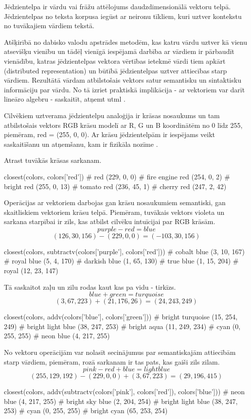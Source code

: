 Jēdzientelpa ir vārdu vai frāžu attēlojums daudzdimensionālā vektoru telpā. Jēdzientelpas no teksta korpusa iegūst ar neironu tīkliem, kuri uztver kontekstu no tuvākajiem vārdiem tekstā. 

Atšķirībā no dabisko valodu apstrādes metodēm, kas katru vārdu uztver kā vienu atsevišķu vienību un tādēļ vienīgā iespējamā darbība ar vārdiem ir pārbaudīt vienādību, katras jēdzientelpas vektora vērtības ietekmē vārdi tiem apkārt (distributed representation) un būtībā jēdzientelpas uztver attiecības starp vārdiem. Rezultātā vārdam atbilstošais vektors satur semantisku un sintaktisku informāciju par vārdu. No tā izriet praktiskā implikācija - ar vektoriem var darīt lineāro algebru - saskaitīt, atņemt utml \cite{colyer2016}.

Cilvēkiem uztverama jēdzientelpu analoģija ir krāsas nosaukums un tam atbilstošais vektors RGB krāsu modelī ar R, G un B koordinātēm no 0 līdz 255, piemēram, red = (255, 0, 0). Ar krāsu jēdzientelpām ir iespējams veikt saskaitīšanu un atņemšanu, kam ir fizikāla nozīme \cite{parrish2017}.

Atrast tuvākās krāsas sarkanam.
\begin{python}
closest(colors, colors['red'])
# red (229, 0, 0)
# fire engine red (254, 0, 2)
# bright red (255, 0, 13)
# tomato red (236, 45, 1)
# cherry red (247, 2, 42)
\end{python}

Operācijas ar vektoriem darbojas gan krāsu nosaukumiem semantiski, gan skaitliskiem vektoriem krāsu telpā. Piemēram, tuvākais vektors violeta un sarkana starpībai ir zils, kas atbilst cilvēku intuīcijai par RGB krāsām.
$$purple - red = blue$$
$$(126, 30, 156) - (229, 0, 0) = (-103, 30, 156)$$
\begin{python}
closest(colors, subtractv(colors['purple'], colors['red']))
# cobalt blue (3, 10, 167)
# royal blue (5, 4, 170)
# darkish blue (1, 65, 130)
# true blue (1, 15, 204)
# royal (12, 23, 147)
\end{python}

Tā saskaitot zaļu un zilu rodas kaut kas pa vidu - tirkīzs.
$$blue + green = turquoise$$
$$(3, 67, 223) + (21, 176, 26) = (24, 243, 249)$$
\begin{python}
closest(colors, addv(colors['blue'], colors['green']))
# bright turquoise (15, 254, 249)
# bright light blue (38, 247, 253)
# bright aqua (11, 249, 234)
# cyan (0, 255, 255)
# neon blue (4, 217, 255)
\end{python}

No vektoru operācijām var nolasīt secinājumus par semantiskajām attiecībām starp vārdiem, piemēram, rozā sarkanam ir tas pats, kas gaiši zils zilam.
$$pink - red + blue = light blue$$
$$(255, 129, 192) - (229, 0, 0) + (3, 67, 223) = (29, 196, 415)$$
\begin{python}
closest(colors, addv(subtractv(colors['pink'], colors['red']), colors['blue']))
# neon blue (4, 217, 255)
# bright sky blue (2, 204, 254)
# bright light blue (38, 247, 253)
# cyan (0, 255, 255)
# bright cyan (65, 253, 254)
\end{python}

